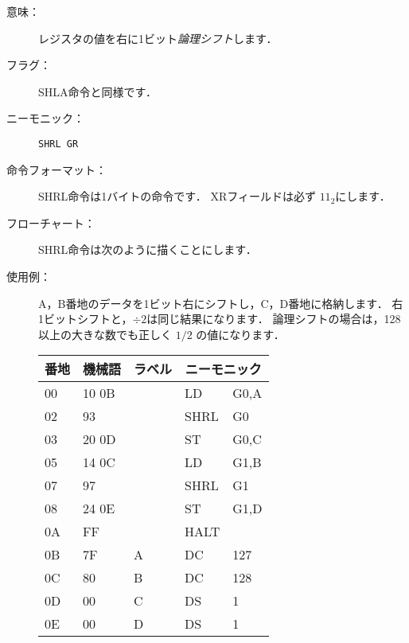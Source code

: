 \begin{description}
\item[意味：]レジスタの値を右に1ビット\emph{論理シフト}します．

\item[フラグ：]
  SHLA命令と同様です．

\item[ニーモニック：]\texttt{SHRL  GR}

\item[命令フォーマット：]SHRL命令は1バイトの命令です．
  XRフィールドは必ず $11_2$にします．


\item[フローチャート：]SHRL命令は次のように描くことにします．

  \begin{center}
  \end{center}

\item[使用例：]
  A，B番地のデータを1ビット右にシフトし，C，D番地に格納します．
  右1ビットシフトと，$\div 2$は同じ結果になります．
  論理シフトの場合は，128以上の大きな数でも正しく $1/2$ の値になります．

  {\ttfamily\begin{center}
    \begin{tabular}{|l|l|l|l l|} \hline
      番地 & 機械語 & ラベル & \multicolumn{2}{|c|}{ニーモニック} \\
      \hline
      00 & 10 0B &   & LD   & G0,A \\
      02 & 93    &   & SHRL & G0   \\
      03 & 20 0D &   & ST   & G0,C \\
      05 & 14 0C &   & LD   & G1,B \\
      07 & 97    &   & SHRL & G1   \\
      08 & 24 0E &   & ST   & G1,D \\
      0A & FF    &   & HALT &      \\
      0B & 7F    & A & DC   & 127  \\
      0C & 80    & B & DC   & 128  \\
      0D & 00    & C & DS   & 1    \\
      0E & 00    & D & DS   & 1    \\
      \hline
    \end{tabular}
  \end{center}}
\end{description}

